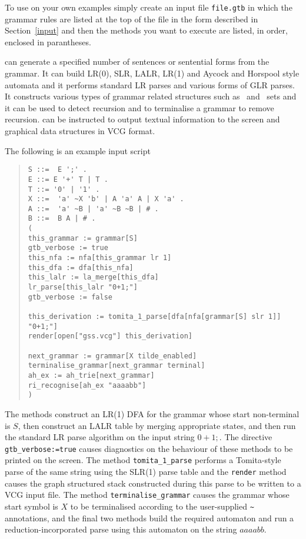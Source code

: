 To use \gtb on your own examples simply create an input file 
{\tt file.gtb} in which the grammar rules are
listed at the top of the file in the form described in
Section~\ref{input} and then the \gtb methods you want to execute are
listed, in order, enclosed in parantheses.

\gtb can generate a specified number of sentences or sentential forms
from the grammar. It can build LR(0), SLR, LALR, LR(1) and Aycock and
Horspool style automata and it performs standard LR parses
and various forms of GLR parses. It constructs various types of
grammar related structures such as \first\ and \follow\ sets and it can
be used to detect recursion and to terminalise a grammar to remove
recursion. \gtb can be instructed to output
textual information to the screen and graphical data structures in VCG
format. 

The following is an example \gtb input script
\begin{quote}
\begin{verbatim}
S ::=  E ';' .
E ::= E '+' T | T .
T ::= '0' | '1' .
X ::=  'a' ~X 'b' | A 'a' A | X 'a' .
A ::=  'a' ~B | 'a' ~B ~B | # .
B ::=  B A | # .
(
this_grammar := grammar[S]
gtb_verbose := true
this_nfa := nfa[this_grammar lr 1]
this_dfa := dfa[this_nfa]
this_lalr := la_merge[this_dfa]
lr_parse[this_lalr "0+1;"]
gtb_verbose := false

this_derivation := tomita_1_parse[dfa[nfa[grammar[S] slr 1]] "0+1;"]
render[open["gss.vcg"] this_derivation]

next_grammar := grammar[X tilde_enabled]
terminalise_grammar[next_grammar terminal]
ah_ex := ah_trie[next_grammar]
ri_recognise[ah_ex "aaaabb"]
)
\end{verbatim}
\end{quote}
The methods construct an LR(1) DFA for the grammar whose start
non-terminal is $S$, then construct an LALR table by merging
appropriate states, and then run the standard LR parse algorithm on
the input string $0+1;$. The directive \verb+gtb_verbose:=true+ causes
diagnostics on the behaviour of these methods to be printed
on the screen. The method \verb+tomita_1_parse+ performs a
Tomita-style parse of the same string using the SLR(1) parse table
and the \verb+render+ method causes the graph structured stack
constructed during this parse to be written to a VCG input file.
The method \verb+terminalise_grammar+ causes the grammar whose start
symbol is $X$ to be terminalised according to the user-supplied
\verb+~+ annotations, and the final two methods build the required
automaton and run a reduction-incorporated parse using this automaton
on the string $aaaabb$.

